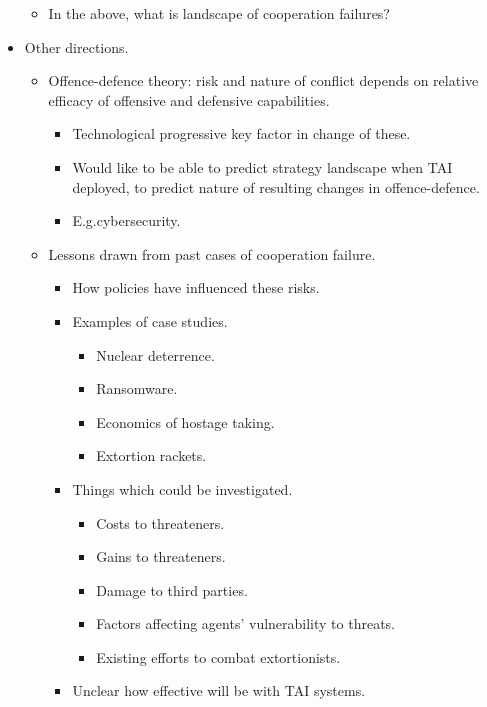 \begin{itemize}
\begin{itemize}
        \item In the above, what is landscape of cooperation failures?
    \end{itemize}
    \item Other directions.
    \begin{itemize}
        \item Offence-defence theory: risk and nature of conflict depends on relative efficacy of offensive and defensive capabilities.
        \begin{itemize}
            \item Technological progressive key factor in change of these.
            \item Would like to be able to predict strategy landscape when TAI deployed, to predict nature of resulting changes in offence-defence.
            \item E.g.\@ cybersecurity.
        \end{itemize}
        \item Lessons drawn from past cases of cooperation failure.
        \begin{itemize}
            \item How policies have influenced these risks.
            \item Examples of case studies.
            \begin{itemize}
                \item Nuclear deterrence.
                \item Ransomware.
                \item Economics of hostage taking.
                \item Extortion rackets.
            \end{itemize}
            \item Things which could be investigated.
            \begin{itemize}
                \item Costs to threateners.
                \item Gains to threateners.
                \item Damage to third parties.
                \item Factors affecting agents' vulnerability to threats.
                \item Existing efforts to combat extortionists.
            \end{itemize}
            \item Unclear how effective will be with TAI systems.

\end{itemize}
\end{itemize}
\end{itemize}
